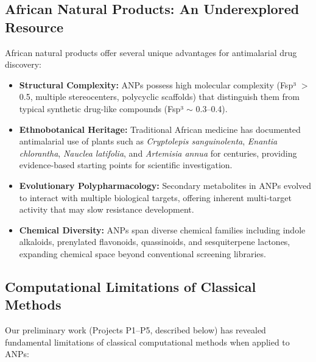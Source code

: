 \documentclass[11pt,a4paper]{article}
\begin{document}
\subsection{African Natural Products: An Underexplored Resource}

African natural products offer several unique advantages for antimalarial drug discovery:

\begin{itemize}[leftmargin=1.5em]
    \item \textbf{Structural Complexity:} ANPs possess high molecular complexity (Fsp³ $>$ 0.5, multiple stereocenters, polycyclic scaffolds) that distinguish them from typical synthetic drug-like compounds (Fsp³ $\sim$ 0.3--0.4).
    
    \item \textbf{Ethnobotanical Heritage:} Traditional African medicine has documented antimalarial use of plants such as \textit{Cryptolepis sanguinolenta}, \textit{Enantia chlorantha}, \textit{Nauclea latifolia}, and \textit{Artemisia annua} for centuries, providing evidence-based starting points for scientific investigation.
    
    \item \textbf{Evolutionary Polypharmacology:} Secondary metabolites in ANPs evolved to interact with multiple biological targets, offering inherent multi-target activity that may slow resistance development.
    
    \item \textbf{Chemical Diversity:} ANPs span diverse chemical families including indole alkaloids, prenylated flavonoids, quassinoids, and sesquiterpene lactones, expanding chemical space beyond conventional screening libraries.
\end{itemize}

\subsection{Computational Limitations of Classical Methods}

Our preliminary work (Projects P1--P5, described below) has revealed fundamental limitations of classical computational methods when applied to ANPs:
\end{document}
